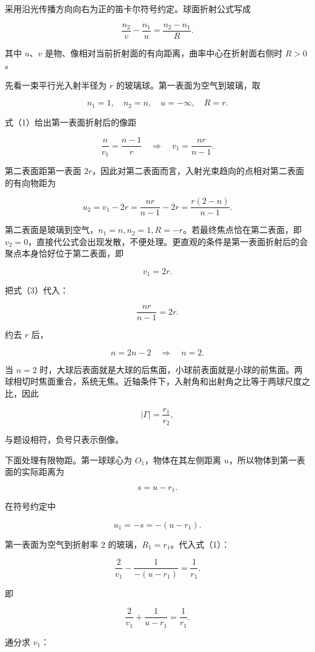 \documentclass[12pt,a4paper,UTF8]{ctexart}
\begin{document}
采用沿光传播方向向右为正的笛卡尔符号约定。球面折射公式写成

\[
\frac{n_2}{v}-\frac{n_1}{u}
=\frac{n_2-n_1}{R}. \tag{1}
\]

其中 \(u\)、\(v\)
是物、像相对当前折射面的有向距离，曲率中心在折射面右侧时 \(R>0\)。

先看一束平行光入射半径为 \(r\) 的玻璃球。第一表面为空气到玻璃，取

\[
n_1=1,\quad n_2=n,\quad u=-\infty,\quad R=r. \tag{2}
\]

式（1）给出第一表面折射后的像距

\[
\frac{n}{v_1}=\frac{n-1}{r}
\quad\Longrightarrow\quad
v_1=\frac{nr}{n-1}. \tag{3}
\]

第二表面距第一表面
\(2r\)，因此对第二表面而言，入射光束趋向的点相对第二表面的有向物距为

\[
u_2=v_1-2r
=\frac{nr}{n-1}-2r
=\frac{r(2-n)}{n-1}. \tag{4}
\]

第二表面是玻璃到空气，\(n_1=n,n_2=1,R=-r\)。若最终焦点恰在第二表面，即
\(v_2=0\)，直接代公式会出现发散，不便处理。更直观的条件是第一表面折射后的会聚点本身恰好位于第二表面，即

\[
v_1=2r. \tag{5}
\]

把式（3）代入：

\[
\frac{nr}{n-1}=2r. \tag{6}
\]

约去 \(r\) 后，

\[
n=2n-2
\quad\Longrightarrow\quad
\boxed{n=2}. \tag{7}
\]

当 \(n=2\)
时，大球后表面就是大球的后焦面，小球前表面就是小球的前焦面。两球相切时焦面重合，系统无焦。近轴条件下，入射角和出射角之比等于两球尺度之比，因此

\[
\left|\Gamma\right|=\frac{r_1}{r_2}, \tag{8}
\]

与题设相符，负号只表示倒像。

下面处理有限物距。第一球球心为 \(O_1\)，物体在其左侧距离
\(u\)，所以物体到第一表面的实际距离为

\[
s=u-r_1. \tag{9}
\]

在符号约定中

\[
u_1=-s=-(u-r_1). \tag{10}
\]

第一表面为空气到折射率 \(2\) 的玻璃，\(R_1=r_1\)。代入式（1）：

\[
\frac{2}{v_1}-\frac{1}{-(u-r_1)}
=\frac1{r_1}. \tag{11}
\]

即

\[
\frac{2}{v_1}+\frac1{u-r_1}=\frac1{r_1}. \tag{12}
\]

通分求 \(v_1\)：
\end{document}
